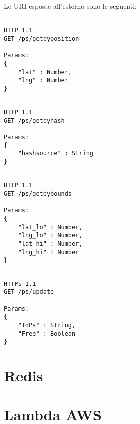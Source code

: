 \vspace{0.5truecm}
Le URI esposte all'esterno sono le seguenti:

\lstset{language=HTTP}          

\begin{lstlisting}[frame=single]

HTTP 1.1 
GET /ps/getbyposition

Params:
{
	"lat" : Number,
	"lng" : Number
}

\end{lstlisting}

\vspace{1truecm}
\begin{lstlisting}[frame=single]

HTTP 1.1 
GET /ps/getbyhash

Params:
{
	"hashsource" : String
}

\end{lstlisting}


\begin{lstlisting}[frame=single]

HTTP 1.1 
GET /ps/getbybounds

Params:
{
	"lat_lo" : Number,
	"lng_lo" : Number,
	"lat_hi" : Number,
	"lng_hi" : Number
}

\end{lstlisting}


\begin{lstlisting}[frame=single]

HTTPs 1.1 
GET /ps/update

Params:
{
	"IdPs" : String,
	"Free" : Boolean
}

\end{lstlisting}






\section{Redis}

\section{Lambda AWS}



